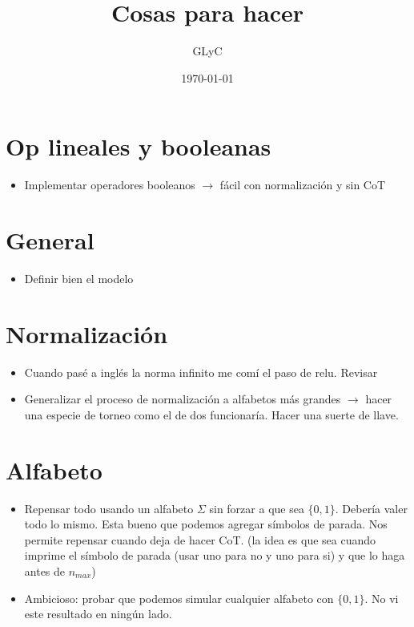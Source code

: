 \documentclass{article}
\title{Cosas para hacer}
\author{GLyC}
\date{\today}
\begin{document}
\maketitle

\section{Op lineales y booleanas}

\begin{itemize}
    \item Implementar operadores booleanos $\rightarrow$ fácil con normalización y sin CoT
\end{itemize}


\section{General}

\begin{itemize}
    \item Definir bien el modelo
\end{itemize}




\section{Normalización}

\begin{itemize}
    \item Cuando pasé a inglés la norma infinito me comí el paso de relu. Revisar
    \item Generalizar el proceso de normalización a alfabetos más grandes $\rightarrow$ hacer una especie de torneo como el de dos funcionaría. Hacer una suerte de llave.
\end{itemize}




\section{Alfabeto}

\begin{itemize}
    \item Repensar todo usando un alfabeto $\Sigma$ sin forzar a que sea $\{0,1\}$. Debería valer todo lo mismo. Esta bueno que podemos agregar símbolos de parada. Nos permite repensar cuando deja de hacer CoT. (la idea es que sea cuando imprime el símbolo de parada (usar uno para no y uno para si) y que lo haga antes de $n_{max}$)
    \item Ambicioso: probar que podemos simular cualquier alfabeto con $\{0,1\}$. No vi este resultado en ningún lado.
\end{itemize}
\end{document}
